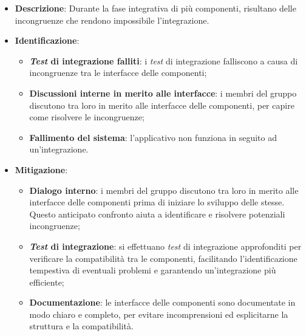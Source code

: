 \label{risk:interfacce incoerenti}
\begin{itemize}
	\item \textbf{Descrizione}:
	      Durante la fase integrativa di più componenti, risultano delle
	      incongruenze che rendono impossibile l'integrazione.
	\item \textbf{Identificazione}:
	      \begin{itemize}
		      \item \textbf{\textit{Test} di integrazione falliti}: i \textit{test} di
		            integrazione falliscono a causa di incongruenze tra le
		            interfacce delle componenti;

		      \item \textbf{Discussioni interne in merito alle interfacce}: i
		            membri del gruppo discutono tra loro in merito alle
		            interfacce delle componenti, per capire come risolvere le
		            incongruenze;

		      \item \textbf{Fallimento del sistema}: l'applicativo non funziona
		            in seguito ad un'integrazione.

	      \end{itemize}
	\item \textbf{Mitigazione}:
	      \begin{itemize}
		      \item \textbf{Dialogo interno}: i membri del gruppo discutono tra loro
		            in merito alle interfacce delle componenti prima di iniziare lo 
					sviluppo delle stesse. Questo anticipato confronto aiuta a identificare 
					e risolvere potenziali incongruenze;

		      \item \textbf{\textit{Test} di integrazione}: si effettuano \textit{test} di integrazione 
			  		approfonditi per verificare la compatibilità tra le componenti, facilitando 
			  		l'identificazione tempestiva di eventuali problemi e garantendo 
			  		un'integrazione più efficiente;

		      \item \textbf{Documentazione}: le interfacce delle componenti sono
		            documentate in modo chiaro e completo, per evitare
		            incomprensioni ed esplicitarne la struttura e la
		            compatibilità.
	      \end{itemize}


\end{itemize}
